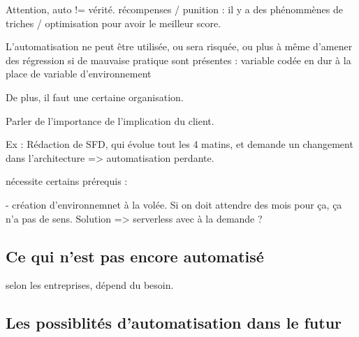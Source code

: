Attention, auto != vérité. récompenses / punition : il y a des phénommènes de triches / optimisation pour avoir le meilleur score.

L'automatisation ne peut être utilisée, ou sera risquée, ou plus à même d'amener des régression si de mauvaise pratique sont présentes : variable codée en dur à la place de variable d'environnement

De plus, il faut une certaine organisation.

Parler de l'importance de l'implication du client. 

Ex :  Rédaction de SFD, qui évolue tout les 4 matins, et demande un changement dans l'architecture => automatisation perdante.

nécessite certains prérequis : 

- création d'environnemnet à la volée. Si on doit attendre des mois pour ça, ça n'a pas de sens. Solution => serverless avec à la demande ? 

\subsection*{Ce qui n'est pas encore automatisé}


selon les entreprises, dépend du besoin.


\subsection*{Les possiblités d'automatisation dans le futur}


